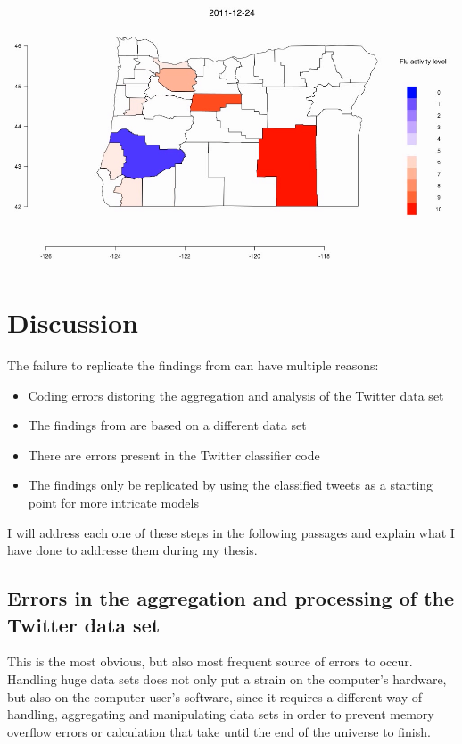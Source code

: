\documentclass[11pt, a4paper]{article}\usepackage[]{graphicx}\usepackage[]{color}
\begin{document}
\centering \href{run:vids/county_Twitter_cdc_diff_oregon.avi}{\includegraphics[scale=0.5]{vids/Screenshot_Oregon.png}} 
\raggedright

\section{Discussion}
The failure to replicate the findings from \citep{bodnar_data_2015} can have multiple reasons: 

\begin{itemize}
\item Coding errors distoring the aggregation and analysis of the Twitter data set
\item The findings from \citep{bodnar_data_2015} are based on a different data set
\item There are errors present in the Twitter classifier code
\item The findings only be replicated by using the classified tweets as a starting point for more intricate models
\end{itemize}

I will address each one of these steps in the following passages and explain what I have done to addresse them during my thesis. 

\subsection{Errors in the aggregation and processing of the Twitter data set}
This is the most obvious, but also most frequent source of errors to occur. Handling huge data sets does not only put a strain on the computer's hardware, but also on the computer user's software, since it requires a different way of handling, aggregating and manipulating data sets in order to prevent memory overflow errors or calculation that take until the end of the universe to finish.\newline
\end{document}
